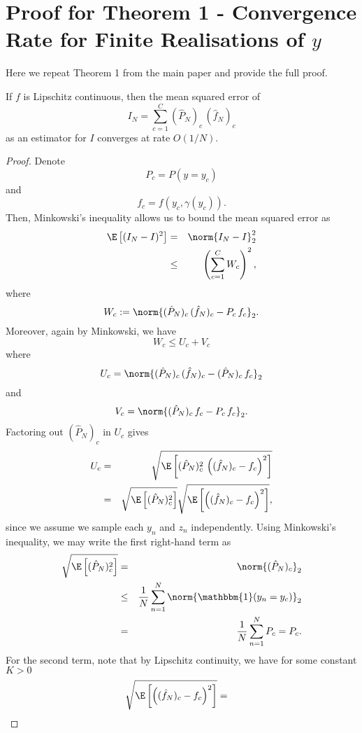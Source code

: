 
\section{Proof for Theorem 1 - Convergence Rate for Finite Realisations of $y$}

Here we repeat Theorem 1 from the main paper and provide the full proof.

\begin{theorem}
	If $f$ is Lipschitz continuous, then the mean squared error of 
	\[
	I_N = \sum_{c=1}^C (\hat{P}_N)_c \, (\hat{f}_N)_c
	\]
	as an estimator for $I$ converges at rate $O(1/N)$.
\end{theorem}

\begin{proof}
	Denote
	\[
	P_c = P(y = y_c)
	\]
	and
	\[
	f_c = f(y_c, \gamma(y_c)).
	\]
	Then, Minkowski's inequality allows us to bound the mean squared error as
	\begin{eqnarray*}
		\E\left[(I_N - I)^2\right] &=& \norm{I_N - I}_2^2 \\
		&\leq& \left(\sum_{c=1}^C W_c \right)^2,
	\end{eqnarray*}
	where
	\[
	W_c := \norm{(\hat{P}_N)_c \, (\hat{f}_N)_c - P_c \, f_c}_2.
	\]
	Moreover, again by Minkowski, we have
	\[
	W_c \leq U_c + V_c
	\]
	where 
	\[
	U_c = \norm{(\hat{P}_N)_c \, (\hat{f}_N)_c - (\hat{P}_N)_c \, f_c}_2
	\]
	and
	\[
	V_c = \norm{(\hat{P}_N)_c \, f_c - P_c \, f_c}_2.
	\]
	Factoring out $(\hat{P}_N)_c$ in $U_c$ gives
	\begin{eqnarray*}
		U_c &=& \sqrt{\E\left[(\hat{P}_N)_c^2 \, \left((\hat{f}_N)_c - f_c\right)^2\right]} \\
		&=& \sqrt{\E\left[(\hat{P}_N)_c^2\right]} \sqrt{\E\left[\left((\hat{f}_N)_c - f_c\right)^2\right]},
	\end{eqnarray*}
	since we assume we sample each $y_n$ and $z_n$ independently. Using Minkowski's
	inequality, we may write the first right-hand term as
	\begin{eqnarray*}
		\sqrt{\E\left[(\hat{P}_N)_c^2\right]} &=& \norm{(\hat{P}_N)_c}_2 \\
		&\leq& \frac{1}{N} \sum_{n=1}^N \norm{\mathbbm{1}(y_n = y_c)}_2 \\
		&=& \frac{1}{N} \sum_{n=1}^N P_c = P_c.
	\end{eqnarray*}
	For the second term, note that by Lipschitz continuity, we have for some constant $K >
	0$
	\begin{eqnarray*}
		\sqrt{\E\left[\left((\hat{f}_N)_c - f_c\right)^2\right]} &=&

\end{eqnarray*}
\end{proof}

